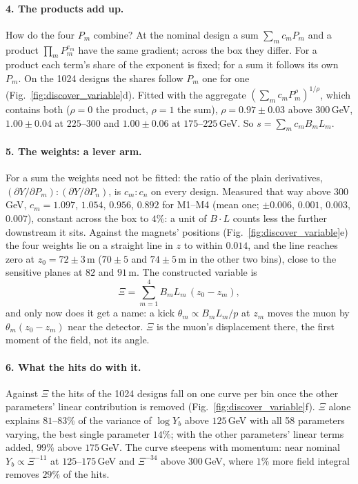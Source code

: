 \documentclass[11pt,a4paper]{article}
\begin{document}
\paragraph{4. The products add up.}
How do the four $P_m$ combine? At the nominal design a sum $\sum_mc_mP_m$ and a product
$\prod_mP_m^{e_m}$ have the same gradient; across the box they differ. For a product each term's
share of the exponent is fixed; for a sum it follows its own $P_m$. On the 1024 designs the shares
follow $P_m$ one for one (Fig.~\ref{fig:discover_variable}d). Fitted with the aggregate
$(\sum_mc_mP_m^\rho)^{1/\rho}$, which contains both ($\rho=0$ the product, $\rho=1$ the sum),
$\rho=0.97\pm0.03$ above $300$\,GeV, $1.00\pm0.04$ at $225$--$300$ and $1.00\pm0.06$ at
$175$--$225$\,GeV. So $s=\sum_mc_mB_mL_m$.

\paragraph{5. The weights: a lever arm.}
For a sum the weights need not be fitted: the ratio of the plain derivatives,
$(\partial Y/\partial P_m):(\partial Y/\partial P_n)$, is $c_m:c_n$ on every design. Measured that
way above $300$\,GeV, $c_m=1.097$, $1.054$, $0.956$, $0.892$ for M1--M4 (mean one;
$\pm0.006$, $0.001$, $0.003$, $0.007$), constant across the box to $4\%$: a unit of $B\cdot L$
counts less the further downstream it sits. Against the magnets' positions
(Fig.~\ref{fig:discover_variable}e) the four weights lie on a straight line in $z$ to within
$0.014$, and the line reaches zero at $z_0=72\pm3$\,m ($70\pm5$ and $74\pm5$\,m in the other two
bins), close to the sensitive planes at $82$ and $91$\,m. The constructed variable is
\begin{equation}
  \Xi=\sum_{m=1}^{4}B_mL_m\,(z_0-z_m),
\end{equation}
and only now does it get a name: a kick $\theta_m\propto B_mL_m/p$ at $z_m$ moves the muon by
$\theta_m(z_0-z_m)$ near the detector. $\Xi$ is the muon's displacement there, the first moment of
the field, not its angle.

\paragraph{6. What the hits do with it.}
Against $\Xi$ the hits of the 1024 designs fall on one curve per bin once the other parameters'
linear contribution is removed (Fig.~\ref{fig:discover_variable}f). $\Xi$ alone explains
$81$--$83\%$ of the variance of $\log Y_b$ above $125$\,GeV with all 58 parameters varying, the
best single parameter $14\%$; with the other parameters' linear terms added, $99\%$ above
$175$\,GeV. The curve steepens with momentum: near nominal $Y_b\propto\Xi^{-11}$ at
$125$--$175$\,GeV and $\Xi^{-34}$ above $300$\,GeV, where $1\%$ more field integral removes
$29\%$ of the hits.
\end{document}
